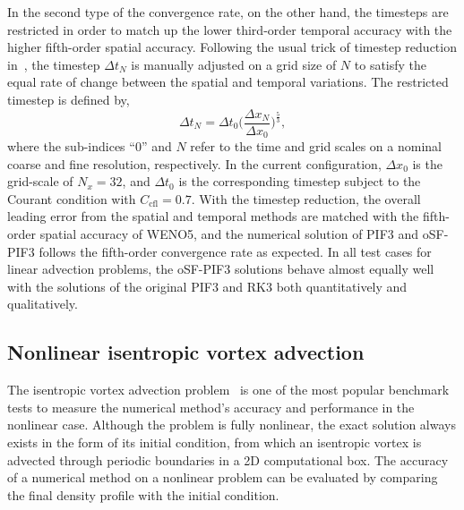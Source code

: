 In the second type of the convergence rate, on the other hand, the timesteps are restricted
in order to match up the lower third-order temporal accuracy with the higher fifth-order spatial accuracy.
Following the usual trick of timestep reduction in~\cite{mignone2010high},
the timestep \( \Delta t_{N} \) is manually adjusted on a grid size of \( N \)
to satisfy the equal rate of change between the spatial and temporal variations.
The restricted timestep is defined by,
\begin{equation}\label{eq:dt_reduction}
    {\Delta t_N} = {\Delta t_0} \Big( \frac{\Delta x_N}{\Delta x_0} \Big)^{\frac{5}{3}},
\end{equation}
where the sub-indices ``0'' and \( N \) refer to the time and grid scales
on a nominal coarse and fine resolution, respectively.
In the current configuration, \( \Delta x_{0} \) is the grid-scale of \( N_{x} = 32 \),
and \( \Delta t_{0} \) is the corresponding timestep subject to the Courant condition with \( C_{\text{cfl}} = 0.7 \).
With the timestep reduction, the overall leading error from the spatial and temporal methods
are matched with the fifth-order spatial accuracy of WENO5,
and the numerical solution of PIF3 and oSF-PIF3 follows the fifth-order convergence rate as expected.
In all test cases for linear advection problems, the oSF-PIF3 solutions behave
almost equally well with the solutions of the original PIF3 and RK3 both quantitatively and qualitatively.



\subsection{Nonlinear isentropic vortex advection}\label{subsec:vortex_weno}

The isentropic vortex advection problem~\cite{shu1998essentially} is one of the most popular benchmark tests
to measure the numerical method's accuracy and performance in the nonlinear case.
Although the problem is fully nonlinear, the exact solution always exists
in the form of its initial condition,
from which an isentropic vortex is advected through periodic boundaries in a 2D computational box.
The accuracy of a numerical method on a nonlinear problem
can be evaluated by comparing the final density profile with the initial condition.

